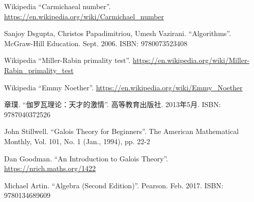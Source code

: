 \documentclass{article}
\begin{document}
\begin{thebibliography}{99}
Wikipedia ``Carmichaeal number''. \url{https://en.wikipedia.org/wiki/Carmichael_number}

Sanjoy Dsgupta, Christos Papadimitriou, Umesh Vazirani. ``Algorithms''. McGraw-Hill Education. Sept. 2006. ISBN: 9780073523408

Wikipedia ``Miller-Rabin primality test''. \url{https://en.wikipedia.org/wiki/Miller-Rabin_primality_test}

Wikipedia ``Emmy Noether''. \url{https://en.wikipedia.org/wiki/Emmy_Noether}

{\fontspec{\cnmainft}章璞. ``伽罗瓦理论：天才的激情''. 高等教育出版社.} 2013年5月. ISBN: 9787040372526

John Stillwell. ``Galois Theory for Beginners''. The American Mathematical Monthly, Vol. 101, No. 1 (Jan., 1994), pp. 22-2

Dan Goodman. ``An Introduction to Galois Theory''. \url{https://nrich.maths.org/1422}

Michael Artin. ``Algebra (Second Edition)''. Pearson. Feb. 2017. ISBN: 9780134689609

\end{thebibliography}

\expandafter\enddocument

\fi
\end{document}
